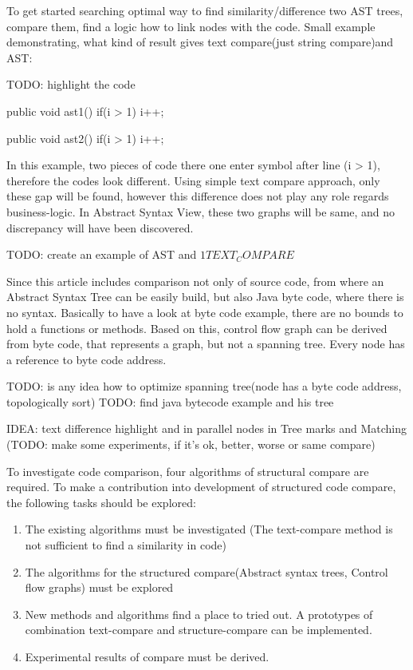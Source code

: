 To get started searching optimal way to find similarity/difference two AST trees, compare them, find a logic how to link nodes with the code. Small example demonstrating, what kind of result gives text compare(just string compare)and AST:

TODO: highlight the code

	public void ast1(){
		if(i > 1) i++;\\
	}
	
	public void ast2(){
		if(i > 1) 
		i++;
	}
	
In this example, two pieces of code there one enter symbol after line (i > 1), therefore the codes look different. Using simple text compare approach, only these gap will be found, however this difference does not play any role regards business-logic. In Abstract Syntax View, these two graphs will be same, and no discrepancy will have been discovered.

TODO: create an example of AST and $1TEXT_COMPARE$
	
Since this article includes comparison not only of source code, from where an Abstract Syntax Tree can be easily build, but also Java byte code, where there is no syntax. Basically to have a look at byte code example, there are no bounds to hold a functions or methods. Based on this, 
control flow graph can be derived from byte code, that represents a graph, but not a spanning tree. Every node has a reference to byte code address.

TODO: is any idea how to optimize spanning tree(node has a byte code address, topologically sort)
TODO: find java bytecode example and his tree

IDEA: text difference highlight and in parallel nodes in Tree marks and Matching
(TODO: make some experiments, if it's ok, better, worse or same compare)

To investigate code comparison, four algorithms of structural compare are required.
To make a contribution into development of structured code compare, the following tasks should be explored:

\begin{enumerate}
  \item The existing algorithms must be investigated (The text-compare method is not sufficient to find a similarity in code)
  \item The algorithms for the structured compare(Abstract syntax trees, Control flow graphs) must be explored 
   \item New methods and algorithms find a place to tried out. A prototypes of combination text-compare and structure-compare can be implemented.
   \item Experimental results of compare must be derived.
\end{enumerate}

